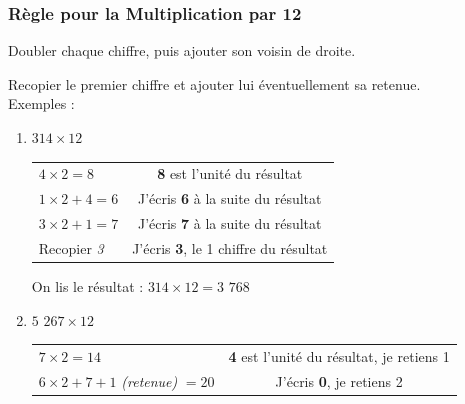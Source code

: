 \documentclass[a4paper]{article}
\begin{document}
\vfill

\pagebreak





\subsubsection*{Règle pour la Multiplication par 12}

Doubler chaque chiffre, puis ajouter son voisin de droite.

Recopier le premier chiffre et ajouter lui éventuellement sa retenue.\\

{ \parindent=0.5cm Exemples : }

\begin{small}
\begin{enumerate}

	\item $314 \times 12$

	\begin{tabular}{l|c}

		$4 \times 2 = 8$ & \textbf{8} est l'unité du résultat
		
		\tabularnewline
		
		$1 \times 2 + 4 = 6$ & J'écris \textbf{6} à la suite du résultat
		
		\tabularnewline
		
		$3 \times 2 + 1 = 7$ & J'écris \textbf{7} à la suite du résultat
		
		\tabularnewline
		
		Recopier \textit{3} & J'écris \textbf{3}, le 1\up{er} chiffre du résultat

	\end{tabular}
	
	On lis le résultat : {\boldmath $314 \times 12 = 3$ $768$}\\
	
	
	
	

	\item $5$ $267 \times 12$

	\begin{tabular}{l|c}

		$7 \times 2 = 14$ & \textbf{4} est l'unité du résultat, je retiens 1
		
		\tabularnewline
		
		$6 \times 2 + 7 + 1$ \textit{(retenue)} $= 20$ & J'écris \textbf{0}, je retiens 2
		
		\tabularnewline
		

\end{tabular}
\end{enumerate}
\end{small}
\end{document}
